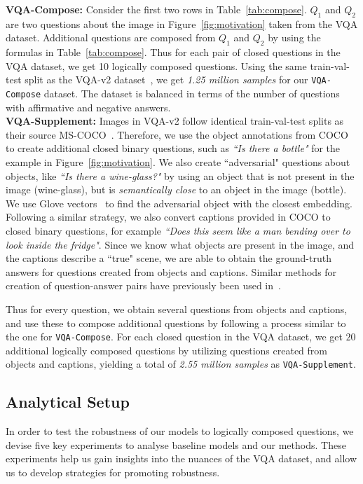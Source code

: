         \noindent\textbf{VQA-Compose:}
        Consider the first two rows in Table~\ref{tab:compose}. 
        $Q_1$ and $Q_2$ are two questions about the image in Figure~\ref{fig:motivation} taken from the VQA dataset.
        Additional questions are composed from $Q_1$ and $Q_2$ by using the formulas in Table~\ref{tab:compose}.
        Thus for each pair of closed questions in the VQA dataset, we get 10 logically composed questions.
        Using the same train-val-test split as the VQA-v2 dataset~\citep{goyal2017making}, we get \textit{1.25 million samples} for our \texttt{VQA-Compose} dataset.
        The dataset is balanced in terms of the number of questions with affirmative and negative answers.\\
        
        \noindent\textbf{VQA-Supplement:}
        Images in VQA-v2 follow identical train-val-test splits as their source MS-COCO~\citep{lin2014microsoft}.
        Therefore, we use the object annotations from COCO to create additional closed binary questions, such as {\it ``Is there a bottle"} for the example in Figure~\ref{fig:motivation}.
        We also create ``adversarial" questions about objects, like {\it ``Is there a wine-glass?"} by using an object that is not present in the image (wine-glass), but is \textit{semantically close} to an object in the image (bottle).
        We use Glove vectors~\citep{pennington2014glove} to find the adversarial object with the closest embedding. 
        Following a similar strategy, we also convert captions provided in COCO to closed binary questions, for example {\it ``Does this seem like a man bending over to look inside the fridge"}.
        Since we know what objects are present in the image, and the captions describe a ``true" scene, we are able to obtain the ground-truth answers for questions created from objects and captions.
        Similar methods for creation of question-answer pairs have previously been used in~\citep{ren2015exploring,malinowski2014multi}.

        Thus for every question, we obtain several questions from objects and captions, and use these to compose additional questions by following a process similar to the one for \texttt{VQA-Compose}.
        For each closed question in the VQA dataset, we get $20$ additional logically composed questions by utilizing questions created from objects and captions, yielding a total of \textit{2.55 million samples} as \texttt{VQA-Supplement}.

    \subsection{Analytical Setup}
    In order to test the robustness of our models to logically composed questions, we devise five key experiments to analyse baseline models and our methods.
    These experiments help us gain insights into the nuances of the VQA dataset, and allow us to develop strategies for promoting robustness.\\

